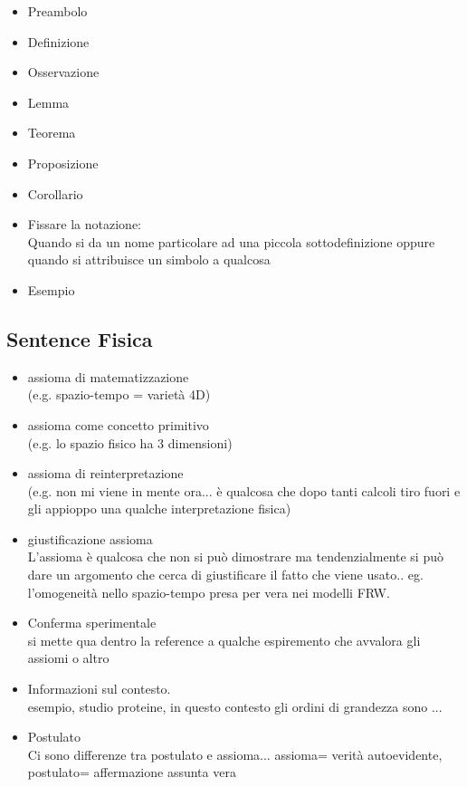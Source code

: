 \documentclass[a4paper,12pt]{article}
\begin{document}
\begin{itemize}
 \item Preambolo
 \item Definizione
 \item Osservazione
 \item Lemma
 \item Teorema
 \item Proposizione
 \item Corollario
 \item Fissare la notazione:
 	\\ Quando si da un nome particolare ad una piccola sottodefinizione oppure quando si attribuisce un simbolo a qualcosa
 \item Esempio 	
 \end{itemize}

\subsection{Sentence Fisica}
\begin{itemize}
 \item assioma di matematizzazione 
 	\\(e.g. spazio-tempo = varietà 4D)
 \item assioma come concetto primitivo 
 	\\(e.g. lo spazio fisico ha 3 dimensioni)
 \item assioma di reinterpretazione 
 	\\(e.g. non mi viene in mente ora... è qualcosa che dopo tanti calcoli tiro fuori e gli appioppo una qualche interpretazione fisica)
 \item giustificazione assioma 
 	\\L'assioma è qualcosa che non si può dimostrare ma tendenzialmente si può dare un argomento che cerca di giustificare il fatto che viene usato.. eg. l'omogeneità nello spazio-tempo presa per vera nei modelli FRW.
 \item Conferma sperimentale
 	\\ si mette qua dentro la reference a qualche espiremento che avvalora gli assiomi o altro
 \item Informazioni sul contesto.
 	\\ esempio, studio proteine, in questo contesto gli ordini di grandezza sono ...
 \item Postulato
 	\\Ci sono differenze tra postulato e assioma... assioma= verità autoevidente, postulato= affermazione assunta vera


\end{itemize}
\end{document}
